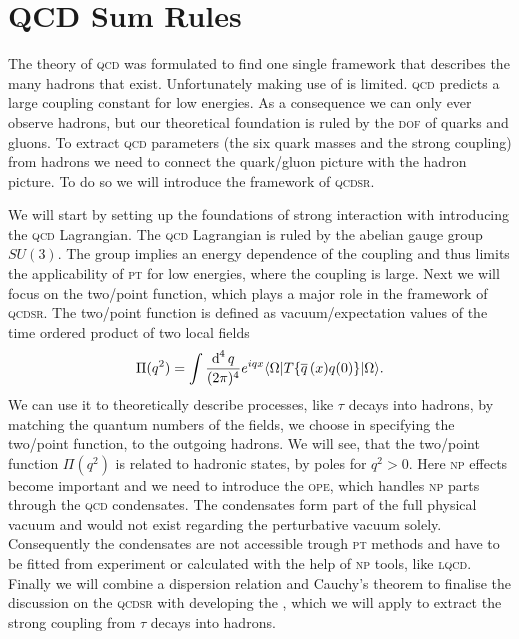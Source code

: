\documentclass[../../index.tex]{subfiles}
\begin{document}
\chapter{QCD Sum Rules}
\label{ch:theoreticalBackground}
The theory of \textsc{qcd} was formulated to find one single framework that
describes the many hadrons that exist. Unfortunately making use of
 is limited. \textsc{qcd} predicts a
large coupling constant for low energies. As a consequence we can only ever
observe hadrons, but our theoretical foundation is ruled by the \textsc{dof} of
quarks and gluons. To extract \textsc{qcd} parameters (the six quark masses and
the strong coupling) from hadrons we need to connect the quark\-/gluon picture
with the hadron picture. To do so we will introduce the framework of
\textsc{qcdsr}.

We will start by setting up the foundations of strong interaction with
introducing the \textsc{qcd} Lagrangian. The \textsc{qcd} Lagrangian is ruled by
the abelian gauge group \(SU(3)\). The group implies an energy dependence of the
coupling and thus limits the applicability of \textsc{pt} for low energies,
where the coupling is large. Next we will focus on the two\-/point function,
which plays a major role in the framework of \textsc{qcdsr}. The two\-/point
function is defined as vacuum\-/expectation values of the time ordered product
of two local fields
\begin{equation}
  \Pi(q^2) = \int\fdif{q} e^{iqx} \langle\Omega\vert T\{ \anti{q}(x)q(0) \} \vert\Omega\rangle.
\end{equation}
We can use it to theoretically describe processes, like \(\tau\) decays into
hadrons, by matching the quantum numbers of the fields, we choose in specifying
the two\-/point function, to the outgoing hadrons. We will see, that the
two\-/point function \(\Pi(q^2)\) is related to hadronic states, by poles for
\(q^2> 0\). Here \textsc{np} effects become important and we need to introduce
the \textsc{ope}, which handles \textsc{np} parts through the \textsc{qcd}
condensates. The condensates form part of the full physical vacuum and would not
exist regarding the perturbative vacuum solely. Consequently the condensates are
not accessible trough \textsc{pt} methods and have to be fitted from experiment
or calculated with the help of \textsc{np} tools, like \textsc{lqcd}. Finally we
will combine a dispersion relation and Cauchy's theorem to finalise the
discussion on the \textsc{qcdsr} with developing the , which we will apply to extract the strong coupling from
\(\tau\) decays into hadrons.
\end{document}
